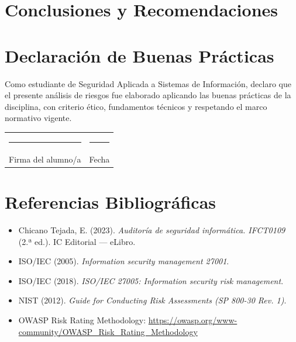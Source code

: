\documentclass[11pt,a4paper]{article}
\begin{document}
\section{Conclusiones y Recomendaciones}

\begin{campolibre}[4cm]
\end{campolibre}

\section{Declaración de Buenas Prácticas}

\begin{informacion}
Como estudiante de Seguridad Aplicada a Sistemas de Información, declaro que el presente análisis de riesgos fue elaborado aplicando las buenas prácticas de la disciplina, con criterio ético, fundamentos técnicos y respetando el marco normativo vigente.
\end{informacion}

\vspace{1.2cm}

\begin{center}
\begin{tabularx}{\textwidth}{@{} X X @{}}
\rule{6cm}{0.4pt} & \rule{6cm}{0.4pt} \\
Firma del alumno/a & Fecha \\
\end{tabularx}
\end{center}

\section{Referencias Bibliográficas}

\begin{itemize}[leftmargin=*]
  \item Chicano Tejada, E. (2023). \textit{Auditoría de seguridad informática. IFCT0109} (2.ª ed.). IC Editorial --- eLibro.
  \item ISO/IEC (2005). \textit{Information security management 27001}.
  \item ISO/IEC (2018). \textit{ISO/IEC 27005: Information security risk management}.
  \item NIST (2012). \textit{Guide for Conducting Risk Assessments (SP 800-30 Rev. 1)}.
  \item OWASP Risk Rating Methodology: \url{https://owasp.org/www-community/OWASP_Risk_Rating_Methodology}
\end{itemize}
\end{document}
